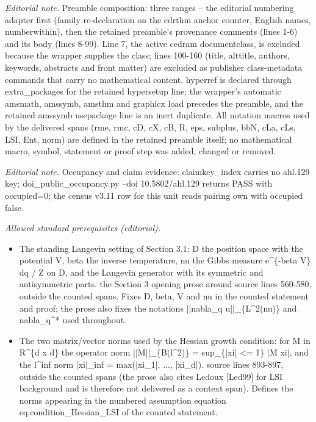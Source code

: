 \documentclass[10pt,a4paper]{article}
\numberwithin{equation}{section}
\begin{document}
\noindent\textit{Editorial note.} Preamble composition: three ranges -- the editorial numbering adapter first (family re-declaration on the cdrthm anchor counter, English names, numberwithin), then the retained preamble's provenance comments (lines 1-6) and its body (lines 8-99). Line 7, the active cedram documentclass, is excluded because the wrapper supplies the class; lines 100-160 (title, alttitle, authors, keywords, abstracts and front matter) are excluded as publisher class-metadata commands that carry no mathematical content. hyperref is declared through extra\_packages for the retained hypersetup line; the wrapper's automatic amsmath, amssymb, amsthm and graphicx load precedes the preamble, and the retained amssymb usepackage line is an inert duplicate. All notation macros used by the delivered spans (rme, rmc, cD, cX, cB, R, eps, subplus, bbN, cLa, cLs, LSI, Ent, norm) are defined in the retained preamble itself; no mathematical macro, symbol, statement or proof step was added, changed or removed.\par\medskip
\noindent\textit{Editorial note.} Occupancy and claim evidence: claimkey\_index carries no ahl.129 key; doi\_public\_occupancy.py --doi 10.5802/ahl.129 returns PASS with occupied=0; the census v3.11 row for this unit reads pairing own with occupied false.\par\medskip
\noindent\textit{Allowed standard prerequisites (editorial).}\begin{itemize}
\item The standing Langevin setting of Section 3.1: D the position space with the potential V, beta the inverse temperature, nu the Gibbs measure e\textasciicircum{}\{-beta V\} dq / Z on D, and the Langevin generator with its symmetric and antisymmetric parts. the Section 3 opening prose around source lines 560-580, outside the counted spans. Fixes D, beta, V and nu in the counted statement and proof; the prose also fixes the notations ||nabla\_q u||\_\{L\textasciicircum{}2(nu)\} and nabla\_q\textasciicircum{}* used throughout.
\item The two matrix/vector norms used by the Hessian growth condition: for M in R\textasciicircum{}\{d x d\} the operator norm ||M||\_\{B(l\textasciicircum{}2)\} = sup\_\{|xi| <= 1\} |M xi|, and the l\textasciicircum{}inf norm |xi|\_inf = max(|xi\_1|, ..., |xi\_d|). source lines 893-897, outside the counted spans (the prose also cites Ledoux [Led99] for LSI background and is therefore not delivered as a context span). Defines the norms appearing in the numbered assumption equation eq:condition\_Hessian\_LSI of the counted statement.
\end{itemize}\medskip
\end{document}

